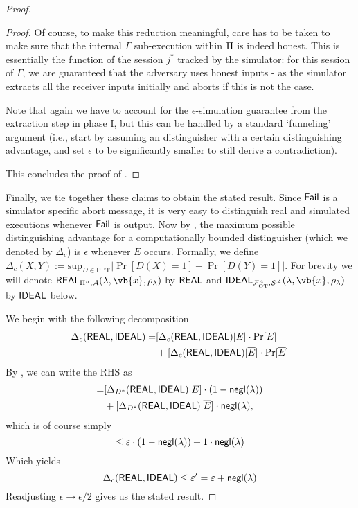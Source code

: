 \begin{proof}
\begin{proof}
    Of course, to make this reduction meaningful, care has to be taken to make sure that the internal $\Gamma$ sub-execution within $\mathrm{\Pi}$ is indeed honest. This is essentially the function of the session $j^*$ tracked by the simulator: for this session of $\Gamma$, we are guaranteed that the adversary uses honest inputs - as the simulator extracts all the receiver inputs initially and aborts if this is not the case. 
    
    Note that again we have to account for the $\epsilon$-simulation guarantee from the extraction step in phase I, but this can be handled by a standard `funneling' argument (i.e., start by assuming an distinguisher with a certain distinguishing advantage, and set $\epsilon$ to be significantly smaller to still derive a contradiction). %
     
This concludes the proof of .

\end{proof}

Finally, we tie together these claims to obtain the stated result. Since $\mathsf{Fail}$ is a simulator specific abort message, it is very easy to distinguish real and simulated executions whenever $\mathsf{Fail}$ is output. Now by , the maximum possible distinguishing advantage for a computationally bounded distinguisher (which we denoted by $\Delta_c$) is $\epsilon$ whenever $E$ occurs. Formally, we define $\Delta_c(X,Y) := \text{sup}_{D \in\text{PPT}}|\Pr[D(X)=1] - \Pr[D(Y)=1]|$. For brevity we will denote $\REAL_{\Prot^n, \Adv}(\secpar, \vb{x}, \rho_\secpar)$ by $\mathsf{REAL}$ and $\IDEAL_{\mathcal{F}^n_{\text{OT}}, \Sim^\Adv}(\secpar, \vb{x}, \rho_\secpar)$ by $\mathsf{IDEAL}$ below. 

We begin with the following decomposition 
\begin{align*}
    \Delta_c(\mathsf{REAL},\mathsf{IDEAL}) = &[\Delta_c(\mathsf{REAL},\mathsf{IDEAL})|E]\cdot\Pr[E] \\ & + [\Delta_c(\mathsf{REAL},\mathsf{IDEAL})|\overline{E}]\cdot\Pr[\overline{E}]
\end{align*}
By , we can write the RHS as 
\begin{align*}
     = &[\Delta_{D^*}(\mathsf{REAL},\mathsf{IDEAL})|E]\cdot(1-\mathsf{negl}(\lambda)) \\ & + [\Delta_{D^*}(\mathsf{REAL},\mathsf{IDEAL})|\overline{E}]\cdot\mathsf{negl}(\lambda),
\end{align*}
which is of course simply $$ \leq \varepsilon\cdot(1-\mathsf{negl}(\lambda) ) + 1\cdot\mathsf{negl}(\lambda)$$ Which yields $$\Delta_c(\mathsf{REAL},\mathsf{IDEAL})\leq \varepsilon' = \varepsilon + \mathsf{negl}(\lambda)$$ Readjusting $\epsilon \rightarrow \epsilon/2$ gives us the stated result. 



\end{proof}
